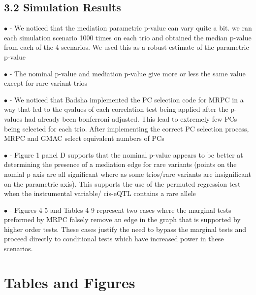 \documentclass[
]{article}
\begin{document}
\subsection*{3.2 Simulation Results}

\(\bullet\) - We noticed that the mediation parametric p-value can vary
quite a bit. we ran each simulation scenario 1000 times on each trio and
obtained the median p-value from each of the 4 scenarios. We used this
as a robust estimate of the parametric p-value

\(\bullet\) - The nominal p-value and mediation p-value give more or
less the same value except for rare variant trios

\(\bullet\) - We noticed that Badsha implemented the PC selection code
for MRPC in a way that led to the qvalues of each correlation test being
applied after the p-values had already been bonferroni adjusted. This
lead to extremely few PCs being selected for each trio. After
implementing the correct PC selection process, MRPC and GMAC select
equivalent numbers of PCs

\(\bullet\) - Figure 1 panel D supports that the nominal p-value appears
to be better at determining the presence of a mediation edge for rare
variants (points on the nomial p axis are all significant where as some
trios/rare variants are insignificant on the parametric axis). This
supports the use of the permuted regression test when the instrumental
variable/ cis-eQTL contains a rare allele

\(\bullet\) - Figures 4-5 and Tables 4-9 represent two cases where the
marginal tests preformed by MRPC falsely remove an edge in the graph
that is supported by higher order tests. These cases justify the need to
bypass the marginal tests and proceed directly to conditional tests
which have increased power in these scenarios.

\newpage
\section{Tables and Figures}
\end{document}
